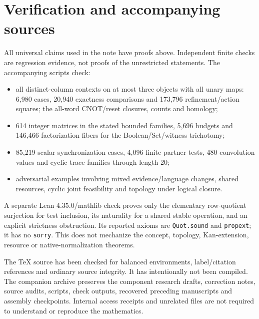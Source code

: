 \section{Verification and accompanying sources}\label{sec:verification}
All universal claims used in the note have proofs above. Independent finite
checks are regression evidence, not proofs of the unrestricted statements.
The accompanying scripts check:
\begin{itemize}
\item all distinct-column contexts on at most three objects with all unary
maps: 6,980 cases, 20,940 exactness comparisons and 173,796 refinement/action
squares; the all-word CNOT/reset closures, counts and homology;
\item 614 integer matrices in the stated bounded families, 5,696 budgets
and 146,466 factorization fibers for the Boolean/Set/witness trichotomy;
\item 85,219 scalar synchronization cases, 4,096 finite partner tests,
480 convolution values and cyclic trace families through length 20;
\item adversarial examples involving mixed evidence/language changes,
shared resources, cyclic joint feasibility and topology under logical closure.
\end{itemize}
A separate Lean 4.35.0/mathlib check proves only the elementary
row-quotient surjection for test inclusion, its naturality for a shared
stable operation, and an explicit strictness obstruction. Its reported
axioms are \texttt{Quot.sound} and \texttt{propext}; it has no
\texttt{sorry}. This does not mechanize the concept, topology,
Kan-extension, resource or native-normalization theorems.

The TeX source has been checked for balanced environments, label/citation
references and ordinary source integrity. It has intentionally not been
compiled. The companion archive preserves the component research drafts,
correction notes, source audits, scripts, check outputs, recovered preceding
manuscripts and assembly checkpoints. Internal access receipts and unrelated
files are not required to understand or reproduce the mathematics.
